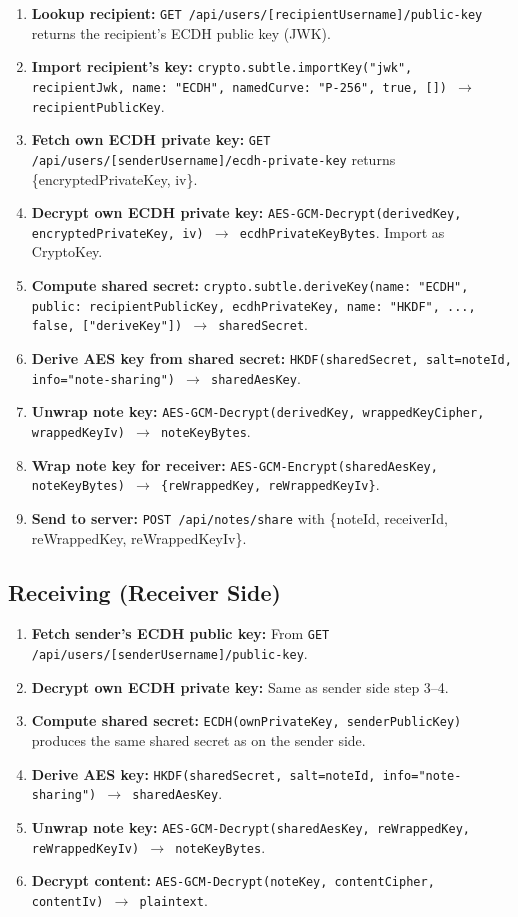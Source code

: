 \begin{enumerate}
    \item \textbf{Lookup recipient:} \texttt{GET /api/users/[recipientUsername]/public-key} returns the recipient's ECDH public key (JWK).
    \item \textbf{Import recipient's key:} \texttt{crypto.subtle.importKey("jwk", recipientJwk, {name: "ECDH", namedCurve: "P-256"}, true, []) $\rightarrow$ recipientPublicKey}.
    \item \textbf{Fetch own ECDH private key:} \texttt{GET /api/users/[senderUsername]/ecdh-private-key} returns \{encryptedPrivateKey, iv\}.
    \item \textbf{Decrypt own ECDH private key:} \texttt{AES-GCM-Decrypt(derivedKey, encryptedPrivateKey, iv) $\rightarrow$ ecdhPrivateKeyBytes}. Import as CryptoKey.
    \item \textbf{Compute shared secret:} \texttt{crypto.subtle.deriveKey({name: "ECDH", public: recipientPublicKey}, ecdhPrivateKey, {name: "HKDF", ...}, false, ["deriveKey"]) $\rightarrow$ sharedSecret}.
    \item \textbf{Derive AES key from shared secret:} \texttt{HKDF(sharedSecret, salt=noteId, info="note-sharing") $\rightarrow$ sharedAesKey}.
    \item \textbf{Unwrap note key:} \texttt{AES-GCM-Decrypt(derivedKey, wrappedKeyCipher, wrappedKeyIv) $\rightarrow$ noteKeyBytes}.
    \item \textbf{Wrap note key for receiver:} \texttt{AES-GCM-Encrypt(sharedAesKey, noteKeyBytes) $\rightarrow$ \{reWrappedKey, reWrappedKeyIv\}}.
    \item \textbf{Send to server:} \texttt{POST /api/notes/share} with \{noteId, receiverId, reWrappedKey, reWrappedKeyIv\}.
\end{enumerate}

\subsection{Receiving (Receiver Side)}

\begin{enumerate}
    \item \textbf{Fetch sender's ECDH public key:} From \texttt{GET /api/users/[senderUsername]/public-key}.
    \item \textbf{Decrypt own ECDH private key:} Same as sender side step 3--4.
    \item \textbf{Compute shared secret:} \texttt{ECDH(ownPrivateKey, senderPublicKey)} produces the same shared secret as on the sender side.
    \item \textbf{Derive AES key:} \texttt{HKDF(sharedSecret, salt=noteId, info="note-sharing") $\rightarrow$ sharedAesKey}.
    \item \textbf{Unwrap note key:} \texttt{AES-GCM-Decrypt(sharedAesKey, reWrappedKey, reWrappedKeyIv) $\rightarrow$ noteKeyBytes}.
    \item \textbf{Decrypt content:} \texttt{AES-GCM-Decrypt(noteKey, contentCipher, contentIv) $\rightarrow$ plaintext}.
\end{enumerate}


